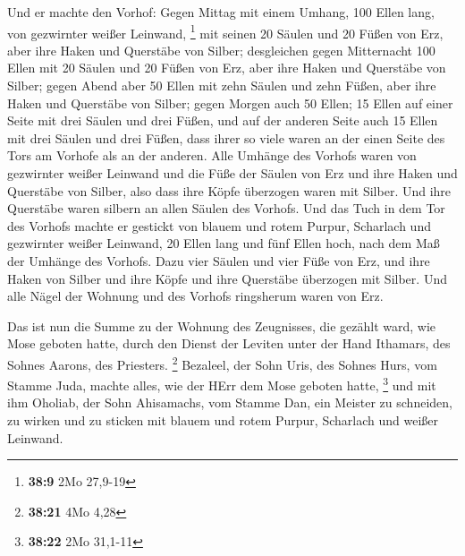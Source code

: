  Und er machte den Vorhof: Gegen Mittag mit einem Umhang,
100 Ellen lang, von gezwirnter weißer Leinwand, \footnote{\textbf{38:9}
  2Mo 27,9-19}  mit seinen 20 Säulen und 20 Füßen von Erz,
aber ihre Haken und Querstäbe von Silber;  desgleichen
gegen Mitternacht 100 Ellen mit 20 Säulen und 20 Füßen von Erz, aber
ihre Haken und Querstäbe von Silber;  gegen Abend aber 50
Ellen mit zehn Säulen und zehn Füßen, aber ihre Haken und Querstäbe von
Silber;  gegen Morgen auch 50 Ellen;  15 Ellen
auf einer Seite mit drei Säulen und drei Füßen,  und auf
der anderen Seite auch 15 Ellen mit drei Säulen und drei Füßen, dass
ihrer so viele waren an der einen Seite des Tors am Vorhofe als an der
anderen.  Alle Umhänge des Vorhofs waren von gezwirnter
weißer Leinwand  und die Füße der Säulen von Erz und ihre
Haken und Querstäbe von Silber, also dass ihre Köpfe überzogen waren mit
Silber. Und ihre Querstäbe waren silbern an allen Säulen des Vorhofs.
 Und das Tuch in dem Tor des Vorhofs machte er gestickt von
blauem und rotem Purpur, Scharlach und gezwirnter weißer Leinwand, 20
Ellen lang und fünf Ellen hoch, nach dem Maß der Umhänge des Vorhofs.
 Dazu vier Säulen und vier Füße von Erz, und ihre Haken von
Silber und ihre Köpfe und ihre Querstäbe überzogen mit Silber.
 Und alle Nägel der Wohnung und des Vorhofs ringsherum
waren von Erz.

 Das ist nun die Summe zu der Wohnung des Zeugnisses, die
gezählt ward, wie Mose geboten hatte, durch den Dienst der Leviten unter
der Hand Ithamars, des Sohnes Aarons, des Priesters. \footnote{\textbf{38:21}
  4Mo 4,28}  Bezaleel, der Sohn Uris, des Sohnes Hurs, vom
Stamme Juda, machte alles, wie der HErr dem Mose geboten hatte,
\footnote{\textbf{38:22} 2Mo 31,1-11}  und mit ihm Oholiab,
der Sohn Ahisamachs, vom Stamme Dan, ein Meister zu schneiden, zu wirken
und zu sticken mit blauem und rotem Purpur, Scharlach und weißer
Leinwand.

